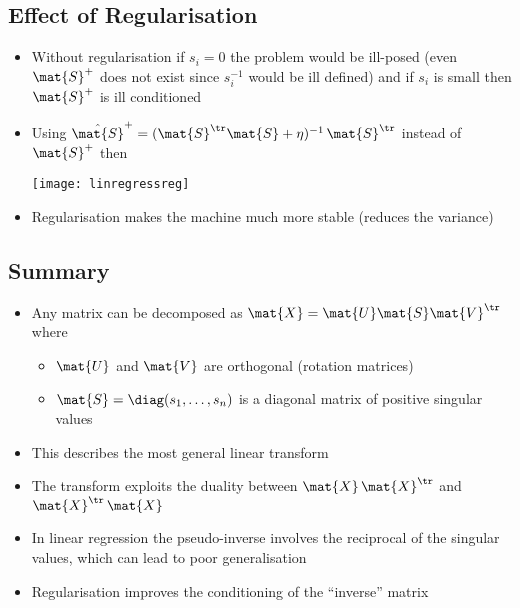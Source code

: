 \begin{slide}
\section[-2]{Effect of Regularisation}

\begin{PauseHighLight}
  \begin{itemize}
  \item Without regularisation if $s_i=0$ the problem would be ill-posed (even $\mat{S}^+$
    does not exist since $s_i^{-1}$ would be ill defined) and if $s_i$
    is small then $\mat{S}^+$ is ill conditioned\pause
  \item Using $\hat{\mat{S}}^+
    =(\mat{S}^\tr\mat{S}+\eta)^{-1}\,\mat{S}^\tr$ instead of
    $\mat{S}^+$ then 
    \begin{center}
     \texttt{[image: linregressreg]} \pause
   \end{center}
   \vspace*{-2ex}
  \item Regularisation makes the machine much more stable (reduces the
    variance)\pause
  \end{itemize}
\end{PauseHighLight}

\end{slide}




\begin{slide}
\section[-2]{Summary}

\begin{PauseHighLight}
  \label{last}

  \begin{itemize}
  \item Any matrix can be decomposed as
    $\mat{X}=\mat{U}\mat{S}\mat{V}^\tr$ where
    \begin{itemize}
    \item $\mat{U}$ and $\mat{V}$ are orthogonal (rotation matrices)\pause
    \item $\mat{S}=\diag(s_1, \ldots, s_n)$ is a diagonal
      matrix of positive singular values\pause
    \end{itemize}
  \item This describes the most general linear transform\pause
  \item The transform exploits the duality between $\mat{X}\,\mat{X}^\tr$
    and $\mat{X}^\tr\,\mat{X}$\pause
  \item In linear regression the pseudo-inverse involves the reciprocal of
    the singular values, which can lead to poor generalisation\pause
  \item Regularisation improves the conditioning of the ``inverse'' matrix\pause
  \end{itemize}
\end{PauseHighLight}
\end{slide}



